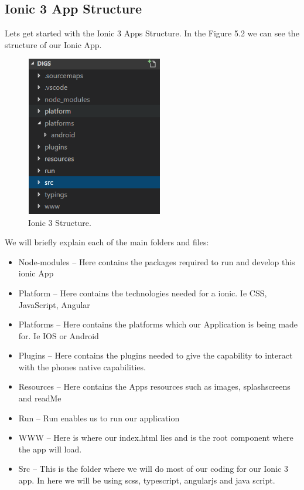 \subsection{Ionic 3 App Structure}

\noindent Lets get started with the Ionic 3 Apps Structure. In the Figure 5.2 we can see the structure of our Ionic App.

\begin{figure}[h]
\centering
\includegraphics[width=6cm, height=7cm]{img/IonicStructure}
\caption{Ionic 3 Structure.}
\end{figure}


\noindent We will briefly explain each of the main folders and files:

\begin{itemize}
\item Node-modules – Here contains the packages required to run and develop this ionic App
\item Platform – Here contains the technologies needed for a ionic. Ie CSS, JavaScript, Angular
\item Platforms – Here contains the platforms which our Application is being made for. Ie IOS or Android
\item Plugins – Here contains the plugins needed to give the capability to interact with the phones native capabilities.
\item Resources – Here contains the Apps resources such as images, splashscreens and readMe
\item Run – Run enables us to run our application
\item WWW – Here is where our index.html lies and is the root component where the app will load. 
\item Src – This is the folder where we will do most of our coding for our Ionic 3 app. In here we will be using scss, typescript, angularjs and java script.
\end{itemize}

